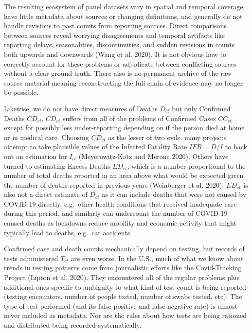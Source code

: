 \documentclass[10pt,letterpaper]{article}
\begin{document}
The resulting ecosystem of panel datasets vary in spatial and temporal
coverage, have little metadata about sources or changing definitions,
and generally do not handle revisions to past counts from reporting
sources. Direct comparisons between sources reveal worrying
disagreements and temporal artifacts like reporting delays,
seasonalities, discontinuities, and sudden revisions in counts both
upwards and downwards (Wang et al. 2020). It is not obvious how to
correctly account for these problems or adjudicate between conflicting
sources without a clear ground truth. There also is no permanent archive
of the raw source material meaning reconstructing the full chain of
evidence may no longer be possible.

Likewise, we do not have direct measures of Deaths \(D_{ct}\) but only
Confirmed Deaths \(CD_{ct}\). \(CD_{ct}\) suffers from all of the
problems of Confirmed Cases \(CC_{ct}\) except for possibly less
under-reporting depending on if the person died at home or in medical
care. Choosing \(CD_{ct}\) as the lesser of two evils, many projects
attempt to take plausible values of the Infected Fatality Rate
\(IFR=D/I\) to back out an estimation for \(I_{ct}\) (Meyerowitz-Katz
and Merone 2020). Others have turned to estimating Excess Deaths
\(ED_{ct}\), which is a number proportional to the number of total
deaths reported in an area above what would be expected given the number
of deaths reported in previous years (Weinberger et al. 2020).
\(ED_{ct}\) is also not a direct estimate of \(D_{ct}\) as it can
include deaths that were not caused by COVID-19 directly, e.g.~other
health conditions that received inadequate care during this period, and
similarly can undercount the number of COVID-19 caused deaths as
lockdowns reduce mobility and economic activity that might typically
lead to deaths, e.g.~car accidents.

Confirmed case and death counts mechanically depend on testing, but
records of tests administered \(T_{ct}\) are even worse. In the U.S.,
much of what we know about trends in testing patterns come from
journalistic efforts like the Covid-Tracking Project (Lipton et al.
2020). They encountered all of the regular problems plus additional ones
specific to ambiguity to what kind of test count is being reported
(testing encounters, number of people tested, number of swabs tested,
etc). The type of test performed (and its false positive and false
negative rate) is almost never included as metadata. Nor are the rules
about how tests are being rationed and distributed being recorded
systematically.
\end{document}
